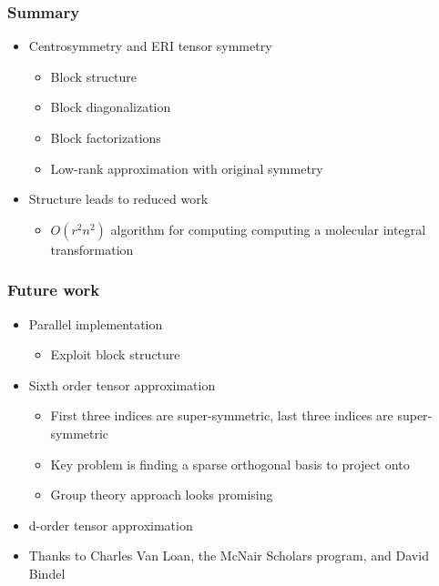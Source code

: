 \documentclass[bigger]{beamer}
\begin{document}
\begin{frame}
\frametitle{Summary}
\label{sec-1-31}
\begin{itemize}

\item Centrosymmetry and ERI tensor symmetry
\label{sec-1-31-1}%
\begin{itemize}

\item Block structure
\label{sec-1-31-1-1}%

\item Block diagonalization
\label{sec-1-31-1-2}%

\item Block factorizations
\label{sec-1-31-1-3}%

\item Low-rank approximation with original symmetry
\label{sec-1-31-1-4}%
\end{itemize} %

\item Structure leads to reduced work
\label{sec-1-31-2}%
\begin{itemize}

\item $O(r^2n^2)$ algorithm for computing computing a molecular integral transformation
\label{sec-1-31-2-1}%
\end{itemize} %
\end{itemize} %
\end{frame}
\begin{frame}
\frametitle{Future work}
\label{sec-1-32}
\begin{itemize}

\item Parallel implementation
\label{sec-1-32-1}%
\begin{itemize}

\item Exploit block structure
\label{sec-1-32-1-1}%
\end{itemize} %

\item Sixth order tensor approximation
\label{sec-1-32-2}%
\begin{itemize}

\item First three indices are super-symmetric, last three indices are super-symmetric
\label{sec-1-32-2-1}%

\item Key problem is finding a sparse orthogonal basis to project onto
\label{sec-1-32-2-2}%

\item Group theory approach looks promising
\label{sec-1-32-2-3}%
\end{itemize} %

\item d-order tensor approximation
\label{sec-1-32-3}%

\item Thanks to Charles Van Loan, the McNair Scholars program, and David Bindel
\label{sec-1-32-4}%
\end{itemize} %
\end{frame}
\end{document}
